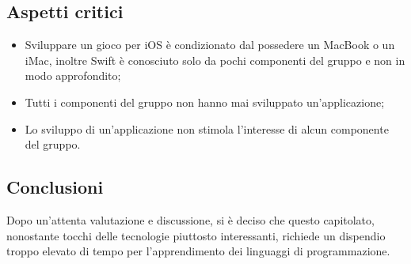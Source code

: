  \subsection{Aspetti critici}
\begin{itemize}
	\item Sviluppare un gioco per iOS è condizionato dal possedere un MacBook o un iMac, inoltre Swift è conosciuto solo da pochi componenti del gruppo e non in modo approfondito;
	\item Tutti i componenti del gruppo non hanno mai sviluppato un'applicazione;
	\item Lo sviluppo di un'applicazione non stimola l'interesse di alcun componente del gruppo.
\end{itemize}

\subsection{Conclusioni}
Dopo un'attenta valutazione e discussione, si è deciso che questo capitolato, nonostante tocchi delle tecnologie piuttosto interessanti, richiede un dispendio troppo elevato di tempo per l'apprendimento dei linguaggi di programmazione.